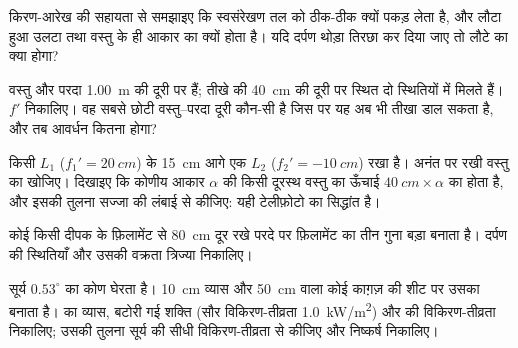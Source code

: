 \begin{exercise}[$\star\star$]\label{exo:b1:mirrors-thin-lenses:8}
किरण-आरेख की सहायता से समझाइए कि स्वसंरेखण  तल को ठीक-ठीक क्यों पकड़ लेता
है, और लौटा हुआ  उलटा तथा वस्तु के ही आकार का क्यों होता है। यदि
दर्पण थोड़ा तिरछा कर दिया जाए तो लौटे  का क्या होगा?
\end{exercise}

\begin{exercise}[$\star\star$]\label{exo:b1:mirrors-thin-lenses:9}
वस्तु और परदा \qty{1.00}{m} की दूरी पर हैं; तीखे   की
\qty{40}{cm} की दूरी पर स्थित दो स्थितियों में मिलते हैं। $f'$ निकालिए। वह
सबसे छोटी वस्तु--परदा दूरी कौन-सी है जिस पर यह  अब भी तीखा 
डाल सकता है, और तब आवर्धन कितना होगा?
\end{exercise}

\begin{exercise}[$\star\star\star$]\label{exo:b1:mirrors-thin-lenses:10}
किसी  $L_1$ ($f_1' = \qty{20}{cm}$) के \qty{15}{cm}
आगे एक  $L_2$ ($f_2' = \qty{-10}{cm}$) रखा है। अनंत पर रखी वस्तु
का  खोजिए। दिखाइए कि कोणीय आकार $\alpha$ की किसी दूरस्थ वस्तु का
 ऊँचाई $\qty{40}{cm}\times\alpha$ का होता है, और इसकी तुलना
सज्जा की लंबाई से कीजिए: यही टेलीफ़ोटो  का सिद्धांत है।
\end{exercise}

\begin{exercise}[$\star\star\star$]\label{exo:b1:mirrors-thin-lenses:11}
कोई  किसी दीपक के फ़िलामेंट से \qty{80}{cm} दूर रखे परदे पर
फ़िलामेंट का तीन गुना बड़ा  बनाता है। दर्पण की स्थितियाँ और उसकी
वक्रता त्रिज्या निकालिए।
\end{exercise}

\begin{exercise}[$\star\star\star$]\label{exo:b1:mirrors-thin-lenses:12}
सूर्य $0.53^\circ$ का कोण घेरता है। \qty{10}{cm} व्यास और \qty{50}{cm}
 वाला कोई  काग़ज़ की शीट पर उसका  बनाता है।
 का व्यास, बटोरी गई शक्ति (सौर विकिरण-तीव्रता
\qty{1.0}{kW/m^2}) और  की विकिरण-तीव्रता निकालिए; उसकी तुलना सूर्य
की सीधी विकिरण-तीव्रता से कीजिए और निष्कर्ष निकालिए।
\end{exercise}

